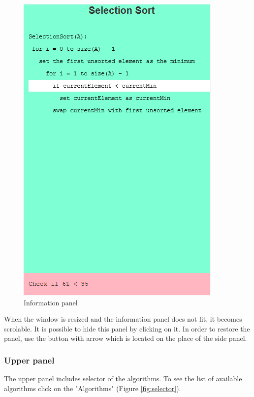 \documentclass[
  field=inf,
  biblatex,
  language=english,
  glossaries,
  theorems=false,
  sourcecodes=false,
  index
]{kidiplom}
\begin{document}
\begin{figure}[H]
\begin{center}
	\includegraphics[scale=0.4]{img/ui/Infopanel.png}
	\caption{Information panel}\label{fig:infopanel}
\end{center}
\end{figure}

When the window is resized and the information panel does not fit, it becomes scrolable. It is possible to hide this panel by clicking on it. In order to restore the panel, use the button with arrow which is located on the place of the side panel.

\subsubsection{Upper panel}
The upper panel includes selector of the algorithms. To see the list of available algorithms click on the "Algorithms" (Figure \ref{fig:selector}).
\end{document}
